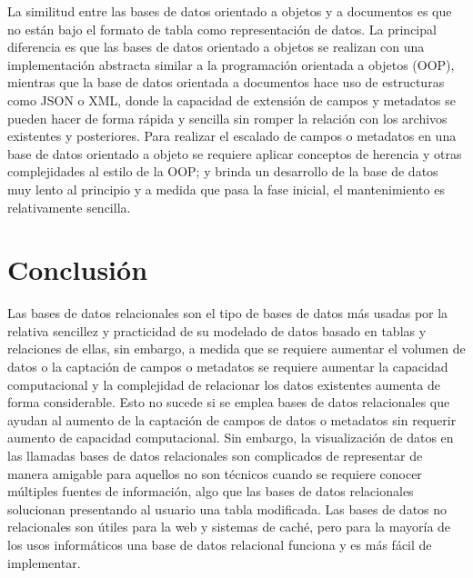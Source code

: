 \documentclass[12pt]{article}
\begin{document}
La similitud entre las bases de datos orientado a objetos y a documentos es que no están bajo el formato de tabla como representación de datos. La principal diferencia es que las bases de datos orientado a objetos se realizan con una implementación abstracta similar a la programación orientada a objetos (OOP), mientras que la base de datos orientada a documentos hace uso de estructuras como JSON o XML, donde la capacidad de extensión de campos y metadatos se pueden hacer de forma rápida y sencilla sin romper la relación con los archivos existentes y posteriores. Para realizar el escalado de campos o metadatos en una base de datos orientado a objeto se requiere aplicar conceptos de herencia y otras complejidades al estilo de la OOP; y brinda un desarrollo de la base de datos muy lento al principio y a medida que pasa la fase inicial, el mantenimiento es relativamente sencilla.

\section*{Conclusión}

Las bases de datos relacionales son el tipo de bases de datos más usadas por la relativa sencillez y practicidad de su modelado de datos basado en tablas y relaciones de ellas, sin embargo, a medida que se requiere aumentar el volumen de datos o la captación de campos o metadatos se requiere aumentar la capacidad computacional y la complejidad de relacionar los datos existentes aumenta de forma considerable. Esto no sucede si se emplea bases de datos relacionales que ayudan al aumento de la captación de campos de datos o metadatos sin requerir aumento de capacidad computacional. Sin embargo, la visualización de datos en las llamadas bases de datos relacionales son complicados de representar de manera amigable para aquellos no son técnicos cuando se requiere conocer múltiples fuentes de información, algo que las bases de datos relacionales solucionan presentando al usuario una tabla modificada. Las bases de datos no relacionales son útiles para la web y sistemas de caché, pero para la mayoría de los usos informáticos una base de datos relacional funciona y es más fácil de implementar.

\newpage

\printbibliography[heading=bibintoc, title={Referencias}]
\newpage

\listoftables
\listoffigures
\lstlistoflistings
\newpage
\end{document}
